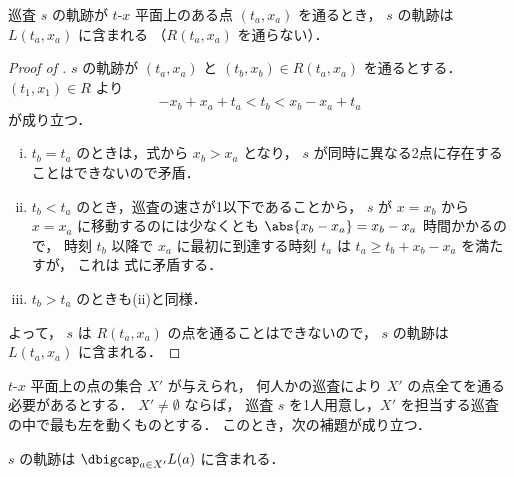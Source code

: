 \begin{lemm}
	\label{lemm:xt_decided_2}
	巡査 $s$ の軌跡が $t$-$x$ 平面上のある点 $(t_a,x_a)$ を通るとき，
	$s$ の軌跡は $L(t_a,x_a)$ に含まれる （$R(t_a,x_a)$ を通らない）．
\end{lemm}

\begin{proof}[Proof of ]
	$s$ の軌跡が $(t_a,x_a)$ と $(t_b,x_b) \in R(t_a,x_a)$ を通るとする．
	$(t_1, x_1) \in R$ より
	\begin{equation}
		\label{eq:lemm:xt_decided_2}
		-x_b + x_a + t_a < t_b < x_b - x_a + t_a
	\end{equation}
	が成り立つ．
	\begin{enumerate}[(i)]
		\item 
		$t_b = t_a$ のときは，式から $x_b > x_a$ となり，
		$s$ が同時に異なる2点に存在することはできないので矛盾．
		\item $t_b < t_a$ のとき，巡査の速さが1以下であることから，
		$s$ が $x = x_b$ から $x = x_a$ に移動するのには少なくとも
		$\abs{x_b - x_a} = x_b - x_a$ 時間かかるので，
		時刻 $t_b$ 以降で $x_a$ に最初に到達する時刻 $t_a$ は
		$t_a \geq t_b + x_b - x_a$ を満たすが，
		これは 式に矛盾する．
		\item $t_b > t_a$ のときも(ii)と同様．
	\end{enumerate}
	よって， $s$ は $R(t_a,x_a)$ の点を通ることはできないので，
	$s$ の軌跡は $L(t_a,x_a)$ に含まれる．
\end{proof}


$t$-$x$ 平面上の点の集合 $X'$ が与えられ，
何人かの巡査により $X'$ の点全てを通る必要があるとする．
$X' \neq \emptyset$ ならば，
巡査 $s$ を1人用意し，$X'$ を担当する巡査の中で最も左を動くものとする．
このとき，次の補題が成り立つ．


\begin{lemm}
	\label{lemm:xt_decided_2_3}
	$s$ の軌跡は $\dbigcap_{a \in X'} L(a)$ に含まれる．
\end{lemm}


